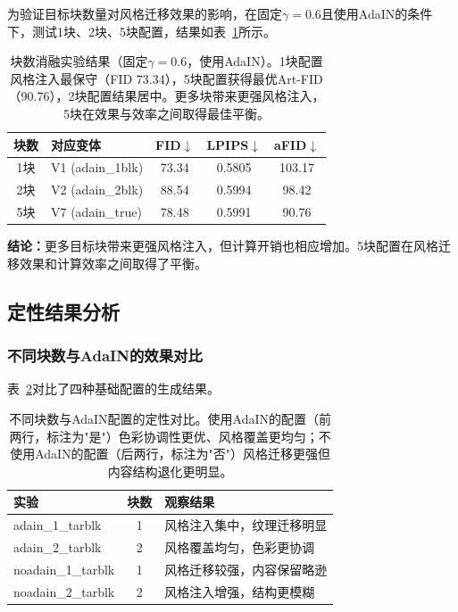 \documentclass[twocolumn,a4paper,11pt]{ctexart}
\begin{document}
为验证目标块数量对风格迁移效果的影响，在固定$\gamma=0.6$且使用AdaIN的条件下，测试1块、2块、5块配置，结果如表~\ref{tab:block_ablation}所示。

\begin{table}[ht]
  \centering
  \caption{块数消融实验结果（固定$\gamma=0.6$，使用AdaIN）。1块配置风格注入最保守（FID 73.34），5块配置获得最优Art-FID（90.76），2块配置结果居中。更多块带来更强风格注入，5块在效果与效率之间取得最佳平衡。}
  \label{tab:block_ablation}
  \small
  \setlength{\tabcolsep}{3pt}
  \begin{tabular}{clccc}
    \toprule
    块数 & 对应变体 & FID$\downarrow$ & LPIPS$\downarrow$ & aFID$\downarrow$ \\
    \midrule
    1块 & V1 (adain\_1blk) & 73.34 & 0.5805 & 103.17 \\
    2块 & V2 (adain\_2blk) & 88.54 & 0.5994 & 98.42  \\
    5块 & V7 (adain\_true) & 78.48 & 0.5991 & 90.76  \\
    \bottomrule
  \end{tabular}
\end{table}

\textbf{结论：}更多目标块带来更强风格注入，但计算开销也相应增加。5块配置在风格迁移效果和计算效率之间取得了平衡。

\subsection{定性结果分析}

\subsubsection{不同块数与AdaIN的效果对比}

表~\ref{tab:qual_blocks}对比了四种基础配置的生成结果。

\begin{table}[ht]
  \centering
  \caption{不同块数与AdaIN配置的定性对比。使用AdaIN的配置（前两行，标注为"是"）色彩协调性更优、风格覆盖更均匀；不使用AdaIN的配置（后两行，标注为"否"）风格迁移更强但内容结构退化更明显。}
  \label{tab:qual_blocks}
  \small
  \setlength{\tabcolsep}{3pt}
  \begin{tabular}{lc>{\raggedright\arraybackslash}p{2.8cm}}
    \toprule
    实验 & 块数 & 观察结果 \\
    \midrule
    adain\_1\_tarblk   & 1 & 风格注入集中，纹理迁移明显 \\
    adain\_2\_tarblk   & 2 & 风格覆盖均匀，色彩更协调 \\
    noadain\_1\_tarblk & 1 & 风格迁移较强，内容保留略逊 \\
    noadain\_2\_tarblk & 2 & 风格注入增强，结构更模糊 \\
    \bottomrule
  \end{tabular}
\end{table}
\end{document}
